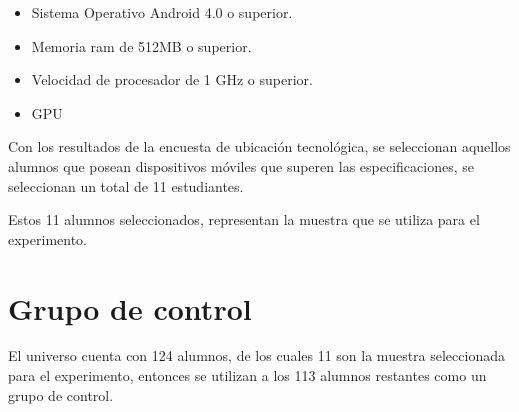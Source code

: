 \begin{itemize}
\item Sistema Operativo Android 4.0 o superior.
\item Memoria ram de 512MB o superior.
\item Velocidad de procesador de 1 GHz o superior.
\item GPU 
\end{itemize}

Con los resultados de la encuesta de ubicación tecnológica, se seleccionan 
aquellos alumnos que posean dispositivos móviles que superen las especificaciones, 
se seleccionan un total de 11 estudiantes.

Estos 11 alumnos seleccionados, representan la muestra que se utiliza para el 
experimento.


\section{Grupo de control}

El universo cuenta con 124 alumnos, de los cuales 11 son la muestra seleccionada
para el experimento, entonces se utilizan a los 113 alumnos restantes como un 
grupo de control.
